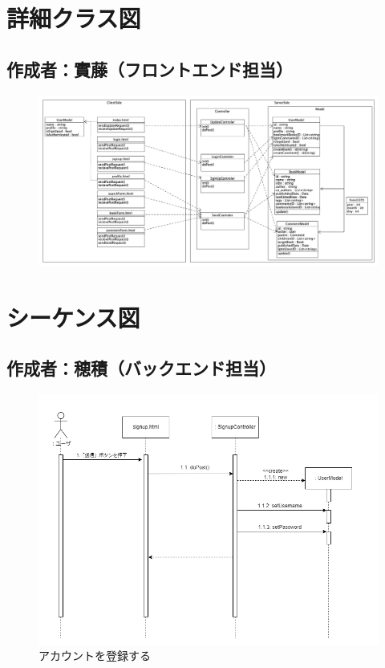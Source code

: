 \documentclass[dvipdfmx]{jsarticle}
\begin{document}
    \newpage

    \section*{詳細クラス図}
    \subsection*{\rm{作成者：實藤（フロントエンド担当）}}
    \begin{figure}[H]
        \begin{center}
            \includegraphics[scale=0.3,clip]{pictures/MVC.png}
        \end{center}
    \end{figure}

    \newpage

    \section*{シーケンス図}
    \subsection*{\rm{作成者：穂積（バックエンド担当）}}
    \begin{figure}[H]
        \begin{center}
            \caption*{アカウントを登録する}
            \includegraphics[scale=0.6,clip]{pictures/sequence-graph/signup.png}
        \end{center}
    \end{figure}
\end{document}
